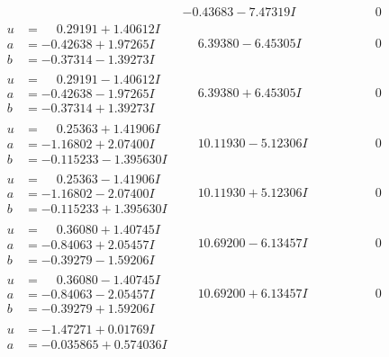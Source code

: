 \documentclass[1p]{elsarticle_modified}
\theoremstyle{definition}
\begin{document}
$$\begin{array}{c|c|c}
 & -0.43683 - 7.47319 I & \phantom{-0.000000 } 0 \\ \hline\begin{aligned}
u &= \phantom{-}0.29191 + 1.40612 I \\
a &= -0.42638 + 1.97265 I \\
b &= -0.37314 - 1.39273 I\end{aligned}
 & \phantom{-}6.39380 - 6.45305 I & \phantom{-0.000000 } 0 \\ \hline\begin{aligned}
u &= \phantom{-}0.29191 - 1.40612 I \\
a &= -0.42638 - 1.97265 I \\
b &= -0.37314 + 1.39273 I\end{aligned}
 & \phantom{-}6.39380 + 6.45305 I & \phantom{-0.000000 } 0 \\ \hline\begin{aligned}
u &= \phantom{-}0.25363 + 1.41906 I \\
a &= -1.16802 + 2.07400 I \\
b &= -0.115233 - 1.395630 I\end{aligned}
 & \phantom{-}10.11930 - 5.12306 I & \phantom{-0.000000 } 0 \\ \hline\begin{aligned}
u &= \phantom{-}0.25363 - 1.41906 I \\
a &= -1.16802 - 2.07400 I \\
b &= -0.115233 + 1.395630 I\end{aligned}
 & \phantom{-}10.11930 + 5.12306 I & \phantom{-0.000000 } 0 \\ \hline\begin{aligned}
u &= \phantom{-}0.36080 + 1.40745 I \\
a &= -0.84063 + 2.05457 I \\
b &= -0.39279 - 1.59206 I\end{aligned}
 & \phantom{-}10.69200 - 6.13457 I & \phantom{-0.000000 } 0 \\ \hline\begin{aligned}
u &= \phantom{-}0.36080 - 1.40745 I \\
a &= -0.84063 - 2.05457 I \\
b &= -0.39279 + 1.59206 I\end{aligned}
 & \phantom{-}10.69200 + 6.13457 I & \phantom{-0.000000 } 0 \\ \hline\begin{aligned}
u &= -1.47271 + 0.01769 I \\
a &= -0.035865 + 0.574036 I \\

\end{aligned}
\end{array}$$
\end{document}
